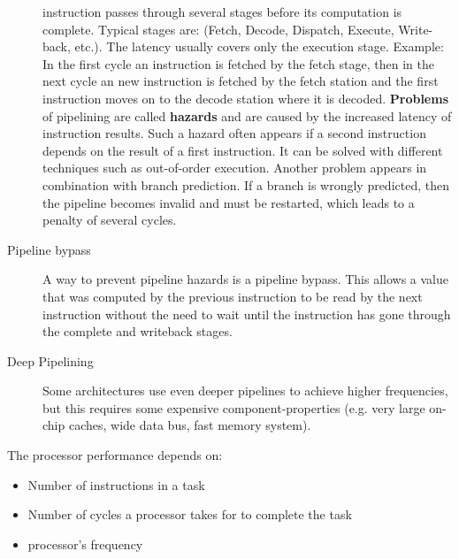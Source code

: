 \documentclass[a4paper,10pt]{article}
\begin{document}
\begin{description}
instruction passes through several stages before its computation is complete. Typical stages are: (Fetch, Decode, Dispatch, Execute,
Write-back, etc.)\cite{powerpc}. The latency usually covers only the execution stage. Example: In the first cycle an instruction is fetched by the
fetch stage, then in the next cycle an new instruction is fetched by the fetch station and the first instruction moves on to the decode
station where it is decoded. \textbf{Problems} of pipelining are called \textbf{hazards} and are caused by the increased latency of
instruction results. Such a hazard often appears if a second instruction depends on the result of a first instruction. It can be solved
with different techniques such as out-of-order execution. Another problem appears in combination with branch prediction. If a branch is
wrongly predicted, then the pipeline becomes invalid and must be restarted, which leads to a penalty of several cycles.
\item[Pipeline bypass] A way to prevent pipeline hazards is a pipeline bypass. This allows a value that was computed by the
previous instruction to be read by the next instruction without the need to wait until the instruction has gone through the complete and
writeback stages.
\item[Deep Pipelining] Some architectures use even deeper pipelines to achieve higher frequencies, but this requires some expensive
component-properties (e.g.  very large on-chip caches, wide data bus, fast memory system)\cite{powerpc}.
\end{description}


The processor performance depends on\cite{powerpc}:
\begin{itemize}
\item Number of instructions in a task
\item Number of cycles a processor takes for to complete the task
\item processor's frequency
\end{itemize}
\end{document}
